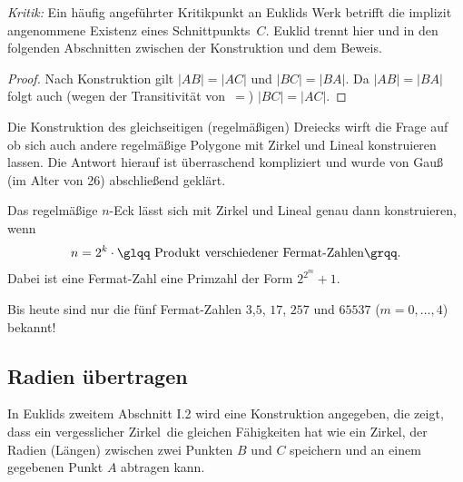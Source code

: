 \begin{center}
    
\end{center}

{\em Kritik:}
Ein häufig angeführter Kritikpunkt an Euklids Werk betrifft die 
implizit angenommene Existenz eines Schnittpunkts~$C$.
%
Euklid trennt hier und in den folgenden Abschnitten 
zwischen der Konstruktion und dem Beweis.

\begin{proof}
Nach Konstruktion gilt $|AB|=|AC|$
und $|BC|=|BA|$. Da $|AB|=|BA|$ folgt auch (wegen der Transitivität
von~\glqq $=$\grqq )
$|BC|=|AC|$.
\end{proof}


Die Konstruktion des gleichseitigen (regelmäßigen) Dreiecks wirft die
Frage auf ob sich auch andere regelmäßige Polygone mit Zirkel und
Lineal konstruieren lassen. Die Antwort hierauf ist überraschend
kompliziert und wurde von Gauß (im Alter von 26) %
abschließend geklärt.
%
%

\begin{thm}[Gauß, 1801]  %
Das regelmäßige $n$-Eck lässt sich mit Zirkel und Lineal
genau dann konstruieren, wenn
$$
n = 2^k \cdot \mbox{\glqq Produkt verschiedener Fermat-Zahlen\grqq}.
$$
Dabei ist eine Fermat-Zahl eine Primzahl der Form $2^{2^m}+1$.
\end{thm}

Bis heute sind nur die fünf Fermat-Zahlen $3$,$5$, $17$, $257$ und
$65537$ ($m=0,\ldots,4$) bekannt!



\subsection*{Radien übertragen}

In Euklids zweitem Abschnitt I.2 wird eine Konstruktion angegeben,
die zeigt, dass ein \glqq vergesslicher Zirkel\grqq\ die gleichen
Fähigkeiten hat wie ein Zirkel, der Radien (Längen) zwischen zwei
Punkten $B$ und $C$ speichern und an einem gegebenen Punkt $A$
abtragen kann.



